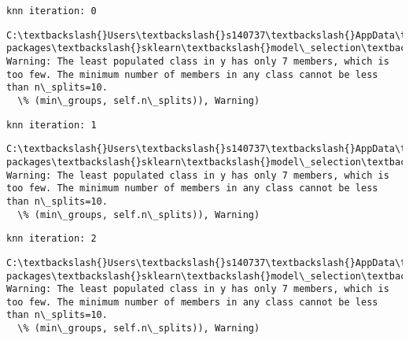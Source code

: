 \documentclass[11pt]{article}
\begin{document}
    \begin{Verbatim}[commandchars=\\\{\}]
knn iteration: 0 

    \end{Verbatim}

    \begin{Verbatim}[commandchars=\\\{\}]
C:\textbackslash{}Users\textbackslash{}s140737\textbackslash{}AppData\textbackslash{}Local\textbackslash{}Continuum\textbackslash{}anaconda3\textbackslash{}lib\textbackslash{}site-packages\textbackslash{}sklearn\textbackslash{}model\_selection\textbackslash{}\_split.py:605: Warning: The least populated class in y has only 7 members, which is too few. The minimum number of members in any class cannot be less than n\_splits=10.
  \% (min\_groups, self.n\_splits)), Warning)

    \end{Verbatim}

    \begin{Verbatim}[commandchars=\\\{\}]
knn iteration: 1 

    \end{Verbatim}

    \begin{Verbatim}[commandchars=\\\{\}]
C:\textbackslash{}Users\textbackslash{}s140737\textbackslash{}AppData\textbackslash{}Local\textbackslash{}Continuum\textbackslash{}anaconda3\textbackslash{}lib\textbackslash{}site-packages\textbackslash{}sklearn\textbackslash{}model\_selection\textbackslash{}\_split.py:605: Warning: The least populated class in y has only 7 members, which is too few. The minimum number of members in any class cannot be less than n\_splits=10.
  \% (min\_groups, self.n\_splits)), Warning)

    \end{Verbatim}

    \begin{Verbatim}[commandchars=\\\{\}]
knn iteration: 2 

    \end{Verbatim}

    \begin{Verbatim}[commandchars=\\\{\}]
C:\textbackslash{}Users\textbackslash{}s140737\textbackslash{}AppData\textbackslash{}Local\textbackslash{}Continuum\textbackslash{}anaconda3\textbackslash{}lib\textbackslash{}site-packages\textbackslash{}sklearn\textbackslash{}model\_selection\textbackslash{}\_split.py:605: Warning: The least populated class in y has only 7 members, which is too few. The minimum number of members in any class cannot be less than n\_splits=10.
  \% (min\_groups, self.n\_splits)), Warning)

    \end{Verbatim}
\end{document}
